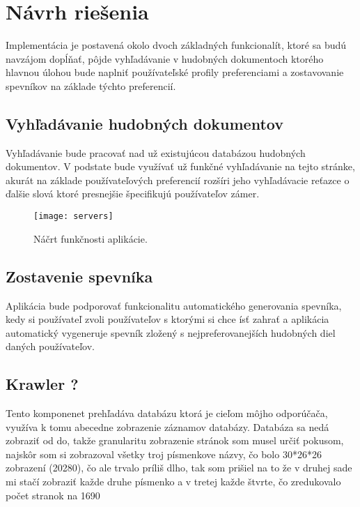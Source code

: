 \newpage

\section{Návrh riešenia}

Implementácia je postavená okolo dvoch základných funkcionalít, ktoré sa budú navzájom dopĺňať, pôjde vyhľadávanie v hudobných dokumentoch ktorého hlavnou úlohou bude naplniť používateľské profily preferenciami a zostavovanie spevníkov na základe týchto preferencií. 

\subsection{Vyhľadávanie hudobných dokumentov}

Vyhľadávanie bude pracovať nad už existujúcou databázou hudobných dokumentov. V podstate bude využívať už funkčné vyhľadávanie na tejto stránke, akurát na základe používateľových preferencií rozšíri jeho vyhľadávacie reťazce o ďalšie slová ktoré presnejšie špecifikujú používateľov zámer.

\begin{figure}\begin{center}\texttt{[image: servers]}
\caption{Náčrt funkčnosti aplikácie.}\label{Náčrt funkčnosti aplikácie}
\end{center}\end{figure}

\subsection{Zostavenie spevníka}

Aplikácia bude podporovať funkcionalitu automatického generovania spevníka, kedy si používateľ zvoli používateľov s ktorými si chce ísť zahrať a aplikácia automatický vygeneruje spevník zložený s nejpreferovanejších hudobných diel daných používateľov.

\subsection{Krawler ?}

Tento komponenet prehľadáva databázu ktorá je cieľom môjho odporúčača,
využíva k tomu abecedne zobrazenie záznamov databázy.
Databáza sa nedá zobraziť od do,
takže granularitu zobrazenie stránok som musel určiť pokusom,
najskôr som si zobrazoval všetky troj písmenkove názvy,
čo bolo 30*26*26 zobrazení (20280), čo ale trvalo príliš dlho,
tak som prišiel na to že v druhej sade mi stačí zobraziť každe druhe písmenko a
v tretej každe štvrte, čo zredukovalo počet stranok na 1690

